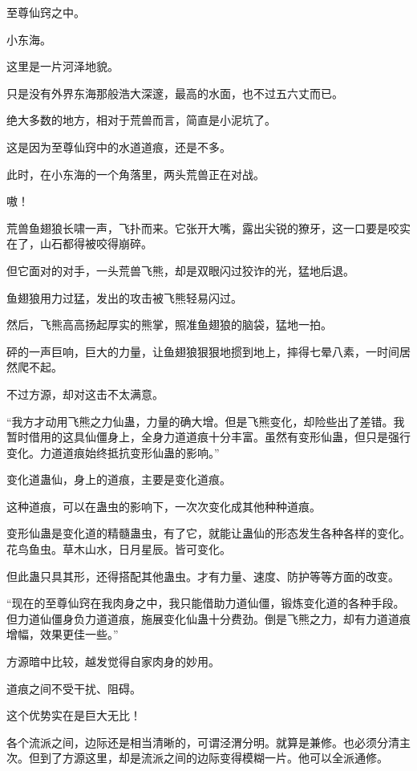 
\begin{this_body}

至尊仙窍之中。

小东海。

这里是一片河泽地貌。

只是没有外界东海那般浩大深邃，最高的水面，也不过五六丈而已。

绝大多数的地方，相对于荒兽而言，简直是小泥坑了。

这是因为至尊仙窍中的水道道痕，还是不多。

此时，在小东海的一个角落里，两头荒兽正在对战。

嗷！

荒兽鱼翅狼长啸一声，飞扑而来。它张开大嘴，露出尖锐的獠牙，这一口要是咬实在了，山石都得被咬得崩碎。

但它面对的对手，一头荒兽飞熊，却是双眼闪过狡诈的光，猛地后退。

鱼翅狼用力过猛，发出的攻击被飞熊轻易闪过。

然后，飞熊高高扬起厚实的熊掌，照准鱼翅狼的脑袋，猛地一拍。

砰的一声巨响，巨大的力量，让鱼翅狼狠狠地掼到地上，摔得七晕八素，一时间居然爬不起。

不过方源，却对这击不太满意。

“我方才动用飞熊之力仙蛊，力量的确大增。但是飞熊变化，却险些出了差错。我暂时借用的这具仙僵身上，全身力道道痕十分丰富。虽然有变形仙蛊，但只是强行变化。力道道痕始终抵抗变形仙蛊的影响。”

变化道蛊仙，身上的道痕，主要是变化道痕。

这种道痕，可以在蛊虫的影响下，一次次变化成其他种种道痕。

变形仙蛊是变化道的精髓蛊虫，有了它，就能让蛊仙的形态发生各种各样的变化。花鸟鱼虫。草木山水，日月星辰。皆可变化。

但此蛊只具其形，还得搭配其他蛊虫。才有力量、速度、防护等等方面的改变。

“现在的至尊仙窍在我肉身之中，我只能借助力道仙僵，锻炼变化道的各种手段。但力道仙僵身负力道道痕，施展变化仙蛊十分费劲。倒是飞熊之力，却有力道道痕增幅，效果更佳一些。”

方源暗中比较，越发觉得自家肉身的妙用。

道痕之间不受干扰、阻碍。

这个优势实在是巨大无比！

各个流派之间，边际还是相当清晰的，可谓泾渭分明。就算是兼修。也必须分清主次。但到了方源这里，却是流派之间的边际变得模糊一片。他可以全派通修。


\end{this_body}
